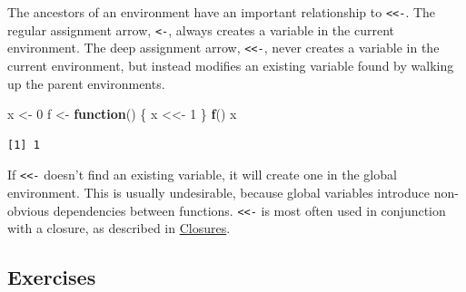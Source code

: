 \documentclass[]{book}
\newenvironment{Shaded}{\begin{snugshade}}{\end{snugshade}}
\newcommand{\ControlFlowTok}[1]{\textcolor[rgb]{0.13,0.29,0.53}{\textbf{#1}}}
\newcommand{\DecValTok}[1]{\textcolor[rgb]{0.00,0.00,0.81}{#1}}
\newcommand{\KeywordTok}[1]{\textcolor[rgb]{0.13,0.29,0.53}{\textbf{#1}}}
\newcommand{\NormalTok}[1]{#1}
\newcommand{\StringTok}[1]{\textcolor[rgb]{0.31,0.60,0.02}{#1}}
\theoremstyle{definition}
\theoremstyle{definition}
\theoremstyle{definition}
\theoremstyle{remark}
\begin{document}
The ancestors of an environment have an important relationship to
\texttt{\textless{}\textless{}-}. The regular assignment arrow,
\texttt{\textless{}-}, always creates a variable in the current
environment. The deep assignment arrow,
\texttt{\textless{}\textless{}-}, never creates a variable in the
current environment, but instead modifies an existing variable found by
walking up the parent environments.

\begin{Shaded}
\begin{Highlighting}[]
\NormalTok{x <-}\StringTok{ }\DecValTok{0}
\NormalTok{f <-}\StringTok{ }\ControlFlowTok{function}\NormalTok{() \{}
\NormalTok{  x <<-}\StringTok{ }\DecValTok{1}
\NormalTok{\}}
\KeywordTok{f}\NormalTok{()}
\NormalTok{x}
\end{Highlighting}
\end{Shaded}

\begin{verbatim}
[1] 1
\end{verbatim}

If \texttt{\textless{}\textless{}-} doesn't find an existing variable,
it will create one in the global environment. This is usually
undesirable, because global variables introduce non-obvious dependencies
between functions. \texttt{\textless{}\textless{}-} is most often used
in conjunction with a closure, as described in
\protect\hyperlink{closures}{Closures}.

\hypertarget{exercises-10}{%
\subsection{Exercises}\label{exercises-10}}
\end{document}
